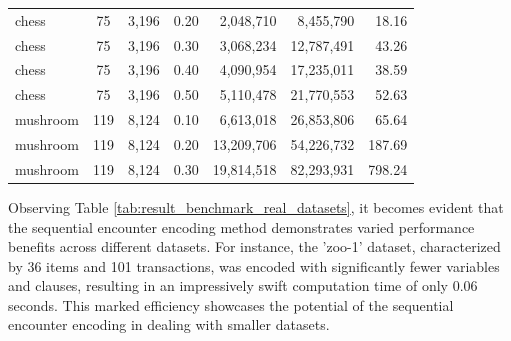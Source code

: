 \begin{table}[H]
\begin{tabular}{|l|c|c|c|r|r|r|}
        chess                             & 75                              & 3,196                           & 0.20                               & 2,048,710                                                 & 8,455,790        & 18.16         \\
        chess                             & 75                              & 3,196                           & 0.30                               & 3,068,234                                                 & 12,787,491       & 43.26         \\
        chess                             & 75                              & 3,196                           & 0.40                               & 4,090,954                                                 & 17,235,011       & 38.59         \\
        chess                             & 75                              & 3,196                           & 0.50                               & 5,110,478                                                 & 21,770,553       & 52.63         \\
        mushroom                          & 119                             & 8,124                           & 0.10                               & 6,613,018                                                 & 26,853,806       & 65.64         \\
        mushroom                          & 119                             & 8,124                           & 0.20                               & 13,209,706                                                & 54,226,732       & 187.69        \\
        mushroom                          & 119                             & 8,124                           & 0.30                               & 19,814,518                                                & 82,293,931       & 798.24        \\ \hline
    \end{tabular}
\end{table}

Observing Table \ref{tab:result_benchmark_real_datasets}, it becomes evident
that the sequential encounter encoding method demonstrates varied performance benefits across different datasets.
For instance, the 'zoo-1' dataset, characterized by 36 items and 101 transactions,
was encoded with significantly fewer variables and clauses, resulting in an impressively swift computation time of
only 0.06 seconds. This marked efficiency showcases the potential of the sequential encounter encoding in dealing with
smaller datasets.

